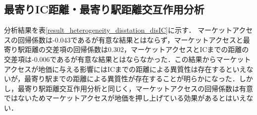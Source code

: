 \subsection{最寄りIC距離・最寄り駅距離交互作用分析}
分析結果を表\ref{result_heterogeneity_disstation_disIC}に示す．
マーケットアクセスの回帰係数は-0.043であるが有意な結果とはならず，マーケットアクセスと最寄り駅距離の交差項の回帰係数は0.302，マーケットアクセスとICまでの距離の交差項は-0.006であるが有意な結果とはならなかった．この結果からマーケットアクセスが地価に与える影響にはICまでの距離による異質性は存在するといえないが，最寄り駅までの距離による異質性が存在することが明らかになった．しかし，最寄り駅距離交互作用分析と同じく，マーケットアクセスの回帰係数は有意ではないためマーケットアクセスが地価を押し上げている効果があるとはいえない．
